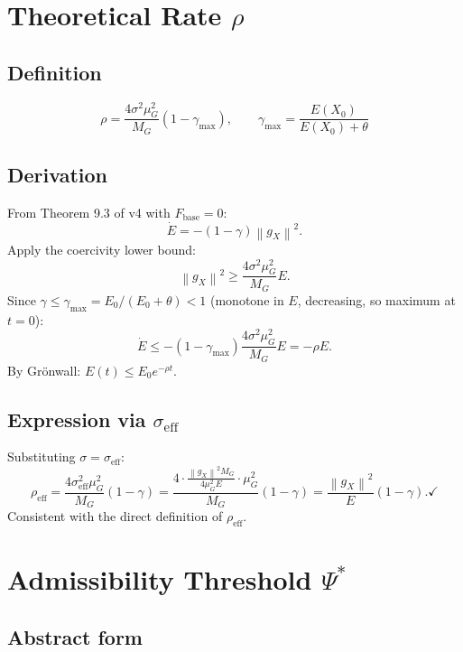 \documentclass[11pt,a4paper]{article}
\theoremstyle{definition}
\newcommand{\norm}[1]{\left\|#1\right\|}
\newcommand{\Fbase}{F_{\mathrm{base}}}
\newcommand{\gX}{g_X}
\begin{document}
\section{Theoretical Rate $\rho$}

\subsection{Definition}

\begin{lockedbox}
\[
\rho = \frac{4\sigma^2\mu_G^2}{M_G}(1-\gamma_\mathrm{max}), \qquad
\gamma_\mathrm{max} = \frac{E(X_0)}{E(X_0)+\theta}
\]
\end{lockedbox}

\subsection{Derivation}

From Theorem 9.3 of v4 with $\Fbase = 0$:
\[
\dot E = -(1-\gamma)\norm{\gX}^2.
\]
Apply the coercivity lower bound:
\[
\norm{\gX}^2 \geq \frac{4\sigma^2\mu_G^2}{M_G}E.
\]
Since $\gamma \leq \gamma_\mathrm{max} = E_0/(E_0+\theta) < 1$ (monotone in $E$, decreasing, so maximum at $t=0$):
\[
\dot E \leq -(1-\gamma_\mathrm{max})\frac{4\sigma^2\mu_G^2}{M_G}E = -\rho E.
\]
By Grönwall: $E(t) \leq E_0 e^{-\rho t}$.

\subsection{Expression via $\sigma_\mathrm{eff}$}

Substituting $\sigma = \sigma_\mathrm{eff}$:
\[
\rho_\mathrm{eff} = \frac{4\sigma_\mathrm{eff}^2\mu_G^2}{M_G}(1-\gamma)
= \frac{4\cdot\frac{\norm{\gX}^2 M_G}{4\mu_G^2 E}\cdot\mu_G^2}{M_G}(1-\gamma)
= \frac{\norm{\gX}^2}{E}(1-\gamma). \checkmark
\]
Consistent with the direct definition of $\rho_\mathrm{eff}$.

\section{Admissibility Threshold $\Psi^*$}

\subsection{Abstract form}
\end{document}
